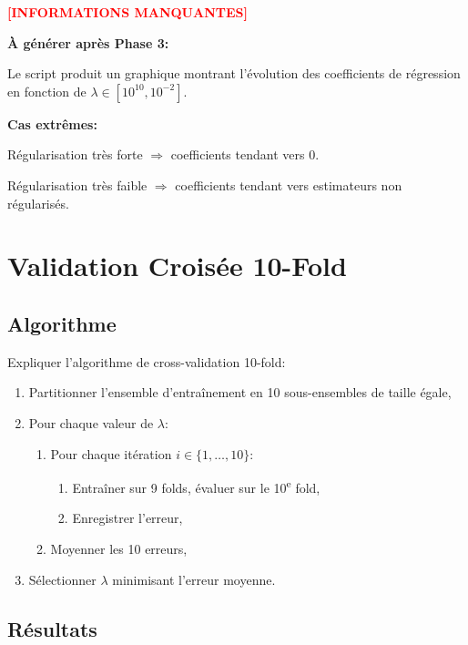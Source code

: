 \documentclass[11pt,a4paper,french]{report}
\begin{document}
\textcolor{red}{\textbf{[INFORMATIONS MANQUANTES]}}

\textbf{À générer après Phase 3:}

Le script produit un graphique montrant l'évolution des coefficients de régression en fonction de $\lambda \in [10^{10}, 10^{-2}]$.

\textbf{Cas extrêmes:}

\begin{description}[labelwidth=2cm]
    \item[$\lambda = 10^{10}$:] Régularisation très forte $\Rightarrow$ coefficients tendant vers 0.
    \item[$\lambda = 10^{-2}$:] Régularisation très faible $\Rightarrow$ coefficients tendant vers estimateurs non régularisés.
\end{description}

\section{Validation Croisée 10-Fold}

\subsection{Algorithme}

Expliquer l'algorithme de cross-validation 10-fold:

\begin{enumerate}
    \item Partitionner l'ensemble d'entraînement en 10 sous-ensembles de taille égale,
    \item Pour chaque valeur de $\lambda$:
    \begin{enumerate}
        \item Pour chaque itération $i \in \{1, \ldots, 10\}$:
        \begin{enumerate}
            \item Entraîner sur 9 folds, évaluer sur le 10\textsuperscript{e} fold,
            \item Enregistrer l'erreur,
        \end{enumerate}
        \item Moyenner les 10 erreurs,
    \end{enumerate}
    \item Sélectionner $\lambda$ minimisant l'erreur moyenne.
\end{enumerate}

\subsection{Résultats}
\end{document}

